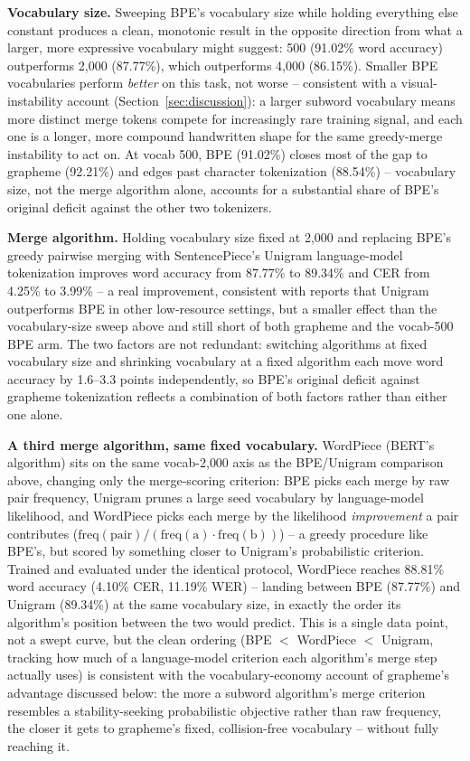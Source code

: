 \documentclass[a4paper,fleqn]{cas-dc}
\begin{document}
\textbf{Vocabulary size.} Sweeping BPE's vocabulary size while holding
everything else constant produces a clean, monotonic result in the
opposite direction from what a larger, more expressive vocabulary might
suggest: 500 (91.02\% word accuracy) outperforms 2{,}000 (87.77\%), which
outperforms 4{,}000 (86.15\%). Smaller BPE vocabularies perform
\emph{better} on this task, not worse -- consistent with a
visual-instability account (Section~\ref{sec:discussion}): a larger
subword vocabulary means more distinct merge tokens compete for
increasingly rare training signal, and each one is a longer, more
compound handwritten shape for the same greedy-merge instability to act
on. At vocab 500, BPE (91.02\%) closes most of the gap to grapheme
(92.21\%) and edges past character tokenization (88.54\%) -- vocabulary
size, not the merge algorithm alone, accounts for a substantial share of
BPE's original deficit against the other two tokenizers.

\textbf{Merge algorithm.} Holding vocabulary size fixed at 2{,}000 and
replacing BPE's greedy pairwise merging with SentencePiece's Unigram
language-model tokenization improves word accuracy from 87.77\% to
89.34\% and CER from 4.25\% to 3.99\% -- a real improvement, consistent
with reports that Unigram outperforms BPE in other low-resource settings,
but a smaller effect than the vocabulary-size sweep above and still short
of both grapheme and the vocab-500 BPE arm. The two factors are not
redundant: switching algorithms at fixed vocabulary size and shrinking
vocabulary at a fixed algorithm each move word accuracy by 1.6--3.3
points independently, so BPE's original deficit against grapheme
tokenization reflects a combination of both factors rather than either one
alone.

\textbf{A third merge algorithm, same fixed vocabulary.} WordPiece
(BERT's algorithm) sits on the same vocab-2{,}000 axis as the BPE/Unigram
comparison above, changing only the merge-scoring criterion: BPE picks
each merge by raw pair frequency, Unigram prunes a large seed vocabulary
by language-model likelihood, and WordPiece picks each merge by the
likelihood \emph{improvement} a pair contributes ($\mathrm{freq(pair)} /
(\mathrm{freq(a)} \cdot \mathrm{freq(b)})$) -- a greedy procedure like
BPE's, but scored by something closer to Unigram's probabilistic
criterion. Trained and evaluated under the identical protocol, WordPiece
reaches 88.81\% word accuracy (4.10\% CER, 11.19\% WER) -- landing
between BPE (87.77\%) and Unigram (89.34\%) at the same vocabulary size,
in exactly the order its algorithm's position between the two would
predict. This is a single data point, not a swept curve, but the clean
ordering (BPE $<$ WordPiece $<$ Unigram, tracking how much of a
language-model criterion each algorithm's merge step actually uses) is
consistent with the vocabulary-economy account of grapheme's advantage
discussed below: the more a subword algorithm's merge criterion
resembles a stability-seeking probabilistic objective rather than raw
frequency, the closer it gets to grapheme's fixed, collision-free
vocabulary -- without fully reaching it.
\end{document}
